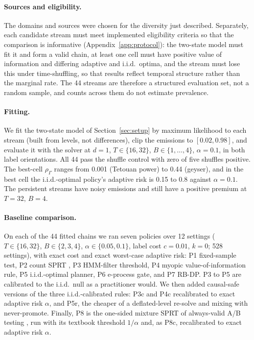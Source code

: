\documentclass{article}
\theoremstyle{plain}
\theoremstyle{definition}
\theoremstyle{remark}
\newcommand{\rhoG}{\rho_\Gamma}
\begin{document}
\paragraph{Sources and eligibility.} The domains and sources were chosen for the diversity just described. Separately, each candidate stream must meet implemented eligibility criteria so that the comparison is informative (Appendix~\ref{app:protocol}): the two-state model must fit it and form a valid chain, at least one cell must have positive value of information and differing adaptive and i.i.d.\ optima, and the stream must lose this under time-shuffling, so that results reflect temporal structure rather than the marginal rate. The 44 streams are therefore a structured evaluation set, not a random sample, and counts across them do not estimate prevalence.

\paragraph{Fitting.} We fit the two-state model of Section~\ref{sec:setup} by maximum likelihood to each stream (built from levels, not differences), clip the emissions to $[0.02,0.98]$, and evaluate it with the solver at $d=1$, $T\in\{16,32\}$, $B\in\{1,\dots,4\}$, $\alpha=0.1$, in both label orientations. All 44 pass the shuffle control with zero of five shuffles positive. The best-cell $\rhoG$ ranges from 0.001 (Tetouan power) to 0.44 (geyser), and in the best cell the i.i.d.-optimal policy's adaptive risk is 0.15 to 0.8 against $\alpha=0.1$. The persistent streams have noisy emissions and still have a positive premium at $T=32$, $B=4$.


\paragraph{Baseline comparison.} On each of the 44 fitted chains we ran seven policies over 12 settings ($T\in\{16,32\}$, $B\in\{2,3,4\}$, $\alpha\in\{0.05,0.1\}$, label cost $c=0.01$, $k=0$; 528 settings), with exact cost and exact worst-case adaptive risk: P1 fixed-sample test, P2 count SPRT \citep{wald1945sequential}, P3 HMM-filter threshold, P4 myopic value-of-information rule, P5 i.i.d.-optimal planner, P6 e-process gate, and P7 RB-DP. P3 to P5 are calibrated to the i.i.d.\ null as a practitioner would. We then added causal-safe versions of the three i.i.d.-calibrated rules: P3c and P4c recalibrated to exact adaptive risk $\alpha$, and P5r, the cheaper of a deflated-level re-solve and mixing with never-promote. Finally, P8 is the one-sided mixture SPRT of always-valid A/B testing \citep{johari2022always}, run with its textbook threshold $1/\alpha$ and, as P8c, recalibrated to exact adaptive risk $\alpha$.
\end{document}
